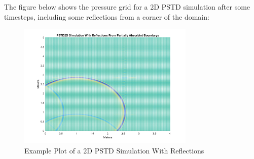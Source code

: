 The figure below shows the pressure grid for a 2D PSTD simulation after some timesteps, including some reflections from a corner of the domain:\\
\begin{figure}[H]
\centering
  \includegraphics[width=0.75\textwidth]{./graphics/pstd2dwithreflectingboundaries.png}
  \caption{Example Plot of a 2D PSTD Simulation With Reflections}
\end{figure}

